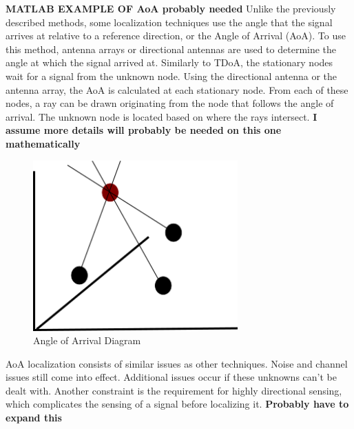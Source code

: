 \textbf{MATLAB EXAMPLE OF AoA probably needed}
Unlike the previously described methods, some localization techniques use the angle that the signal arrives at relative to a reference direction, or the Angle of Arrival (AoA)\cite{local_aoa}. To use this method, antenna arrays or directional antennas are used to determine the angle at which the signal arrived at. Similarly to TDoA, the stationary nodes wait for a signal from the unknown node. Using the directional antenna or the antenna array, the AoA is calculated at each stationary node. From each of these nodes, a ray can be drawn originating from the node that follows the angle of arrival. The unknown node is located based on where the rays intersect.
\textbf{I assume more details will probably be needed on this one mathematically}
\begin{figure}[ht]
\centering
\includegraphics[width=0.70\textwidth]{img/path4188.png}
\caption{Angle of Arrival Diagram}
\label{fig:aoa_diagram}
\end{figure}\par
AoA localization consists of similar issues as other techniques. Noise and channel issues still come into effect. Additional issues occur if these unknowns can’t be dealt with. Another constraint is the requirement for highly directional sensing, which complicates the sensing of a signal before localizing it. \textbf{Probably have to expand this}

